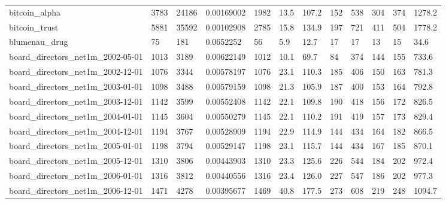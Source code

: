 \begin{longtable}{llllllllllll}
 bitcoin\_alpha                                      & 3783       & 24186     & 0.00169002  & 1982  & 13.5   & 107.2  & 152   & 538    & 304    & 374    & 1278.2  \\
 bitcoin\_trust                                      & 5881       & 35592     & 0.00102908  & 2785  & 15.8   & 134.9  & 197   & 721    & 411    & 504    & 1778.2  \\
 blumenau\_drug                                      & 75         & 181       & 0.0652252   & 56    & 5.9    & 12.7   & 17    & 17     & 13     & 15     & 34.6    \\
 board\_directors\_net1m\_2002-05-01                   & 1013       & 3189      & 0.00622149  & 1012  & 10.1   & 69.7   & 84    & 374    & 144    & 155    & 733.6   \\
 board\_directors\_net1m\_2002-12-01                   & 1076       & 3344      & 0.00578197  & 1076  & 23.1   & 110.3  & 185   & 406    & 150    & 163    & 781.3   \\
 board\_directors\_net1m\_2003-01-01                   & 1098       & 3488      & 0.00579159  & 1098  & 21.3   & 105.9  & 187   & 400    & 153    & 164    & 792.8   \\
 board\_directors\_net1m\_2003-12-01                   & 1142       & 3599      & 0.00552408  & 1142  & 22.1   & 109.8  & 190   & 418    & 156    & 172    & 826.5   \\
 board\_directors\_net1m\_2004-01-01                   & 1145       & 3604      & 0.00550279  & 1145  & 22.1   & 110.2  & 191   & 419    & 157    & 173    & 829.4   \\
 board\_directors\_net1m\_2004-12-01                   & 1194       & 3767      & 0.00528909  & 1194  & 22.9   & 114.9  & 144   & 434    & 164    & 182    & 866.5   \\
 board\_directors\_net1m\_2005-01-01                   & 1198       & 3794      & 0.00529147  & 1198  & 23.1   & 115.7  & 144   & 434    & 167    & 185    & 870.1   \\
 board\_directors\_net1m\_2005-12-01                   & 1310       & 3806      & 0.00443903  & 1310  & 23.3   & 125.6  & 226   & 544    & 184    & 202    & 972.4   \\
 board\_directors\_net1m\_2006-01-01                   & 1316       & 3812      & 0.00440556  & 1316  & 23.4   & 126.0  & 227   & 547    & 186    & 202    & 977.3   \\
 board\_directors\_net1m\_2006-12-01                   & 1471       & 4278      & 0.00395677  & 1469  & 40.8   & 177.5  & 273   & 608    & 219    & 248    & 1094.7  \\

\end{longtable}

